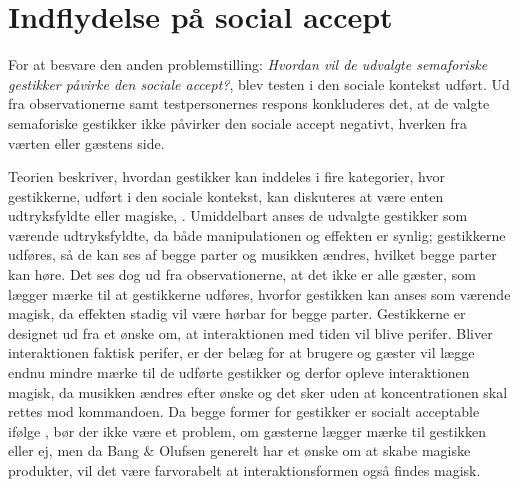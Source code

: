\section{Indflydelse på social accept}
\label{DiskussionSocialAccept}
%
For at besvare den anden problemstilling: \textit{Hvordan vil de udvalgte semaforiske gestikker påvirke den sociale accept?}, blev testen i den sociale kontekst udført. Ud fra observationerne samt testpersonernes respons konkluderes det, at de valgte semaforiske gestikker ikke påvirker den sociale accept negativt, hverken fra værten eller gæstens side.
 
Teorien beskriver, hvordan gestikker kan inddeles i fire kategorier, hvor gestikkerne, udført i den sociale kontekst, kan diskuteres at være enten udtryksfyldte eller magiske, \parencite[s. 276]{PDF:WouldYouDoThat}. Umiddelbart anses de udvalgte gestikker som værende udtryksfyldte, da både manipulationen og effekten er synlig; gestikkerne udføres, så de kan ses af begge parter og musikken ændres, hvilket begge parter kan høre. Det ses dog ud fra observationerne, at det ikke er alle gæster, som lægger mærke til at gestikkerne udføres, hvorfor gestikken kan anses som værende magisk, da effekten stadig vil være hørbar for begge parter. Gestikkerne er designet ud fra et ønske om, at interaktionen med tiden vil blive perifer. Bliver interaktionen faktisk perifer, er der belæg for at brugere og gæster vil lægge endnu mindre mærke til de udførte gestikker og derfor opleve interaktionen magisk, da musikken ændres efter ønske og det sker uden at koncentrationen skal rettes mod kommandoen. Da begge former for gestikker er socialt acceptable ifølge \textcite[s. 277]{PDF:WouldYouDoThat}, bør der ikke være et problem, om gæsterne lægger mærke til gestikken eller ej, men da Bang $\&$ Olufsen generelt har et ønske om at skabe magiske produkter, vil det være farvorabelt at interaktionsformen også findes magisk.\blankline
%
